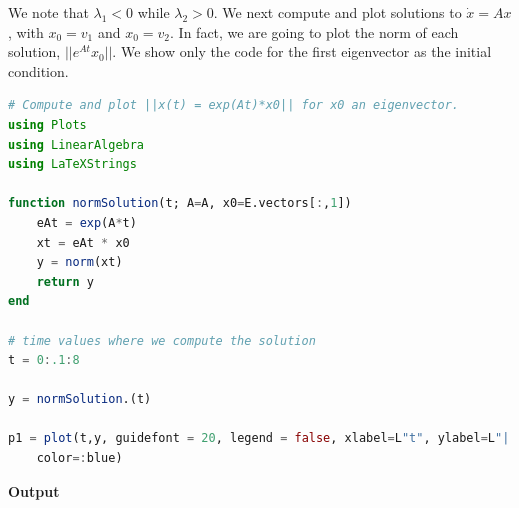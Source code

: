We note that $\lambda_1 < 0$ while $\lambda_2>0$. We next compute and plot solutions to $\dot{x}=Ax$, with $x_0 = v_1$ and $x_0 = v_2$. In fact, we are going to plot the norm of each solution, $||e^{At} x_0||$. We show only the code for the first eigenvector as the initial condition.

\begin{lstlisting}[language=Julia,style=mystyle]
# Compute and plot ||x(t) = exp(At)*x0|| for x0 an eigenvector.
using Plots
using LinearAlgebra
using LaTeXStrings

function normSolution(t; A=A, x0=E.vectors[:,1])
    eAt = exp(A*t)
    xt = eAt * x0
    y = norm(xt)
    return y
end

# time values where we compute the solution
t = 0:.1:8

y = normSolution.(t)

p1 = plot(t,y, guidefont = 20, legend = false, xlabel=L"t", ylabel=L"||e^{At}\cdot x_0 ||", lw=3, 
    color=:blue)
\end{lstlisting}
\textbf{Output} 
